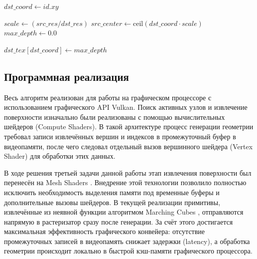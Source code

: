 \begin{algorithm}[H]
    \SetAlFnt{\small\rmfamily}
    \SetAlCapFnt{\small\rmfamily}
    \SetAlCapNameFnt{\small\rmfamily}


    \BlankLine
    $dst\_coord \leftarrow id.xy$\;


    \BlankLine
    $scale \leftarrow (src\_res / dst\_res)$\;
    $src\_center \leftarrow \text{ceil}(dst\_coord \cdot scale)$\;
    $max\_depth \leftarrow 0.0$\;

    \BlankLine

    \BlankLine
    $dst\_tex[dst\_coord] \leftarrow max\_depth$\;

    \caption{Генерация Mip-уровня Hi-Z буфера (консервативный фильтр $3 \times 3$)}
    \label{alg:hz_buffer}
\end{algorithm}

\subsection{Программная реализация} \label{ssec:optimization}

Весь алгоритм реализован для работы на графическом процессоре с использованием графического API Vulkan. Поиск активных узлов и извлечение поверхности изначально были реализованы с помощью вычислительных шейдеров (Compute Shaders). В такой архитектуре процесс генерации геометрии требовал записи извлечённых вершин и индексов в промежуточный буфер в видеопамяти, после чего следовал отдельный вызов вершинного шейдера (Vertex Shader) для обработки этих данных.

В ходе решения третьей задачи данной работы этап извлечения поверхности был перенесён на Mesh Shaders \cite{nvidia_mesh_shaders}. Внедрение этой технологии позволило полностью исключить необходимость выделения памяти под временные буферы и дополнительные вызовы шейдеров. В текущей реализации примитивы, извлечённые из неявной функции алгоритмом Marching Cubes \cite{lorensen1987marching}, отправляются напрямую в растеризатор сразу после генерации. За счёт этого достигается максимальная эффективность графического конвейера: отсутствие промежуточных записей в видеопамять снижает задержки (latency), а обработка геометрии происходит локально в быстрой кэш-памяти графического процессора.

